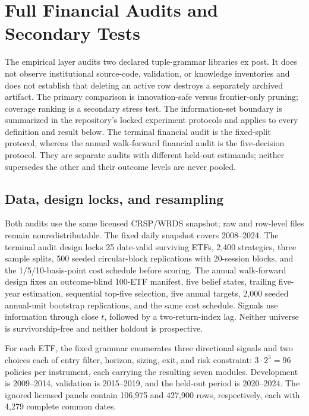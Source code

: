 \section{Full Financial Audits and Secondary Tests}
\label{sec:supp-financial-audit}

The empirical layer audits two declared tuple-grammar libraries ex post. It
does not observe institutional source-code, validation, or knowledge
inventories and does not establish that deleting an active row destroys a
separately archived artifact. The primary comparison is innovation-safe versus
frontier-only pruning; coverage ranking is a secondary stress test. The
information-set boundary is summarized in
the repository's locked experiment protocols and applies to every definition
and result below.
The terminal financial audit is the fixed-split protocol, whereas the annual
walk-forward financial audit is the five-decision protocol.  They are separate
audits with different held-out estimands; neither supersedes the other and
their outcome levels are never pooled.

\subsection{Data, design locks, and resampling}

Both audits use the same licensed CRSP/WRDS snapshot; raw and row-level files
remain nonredistributable.  The fixed daily snapshot covers 2008--2024.  The
terminal audit design locks 25 date-valid surviving ETFs, 2,400 strategies, three
sample splits, 500 seeded circular-block replications with 20-session blocks,
and the 1/5/10-basis-point cost schedule before scoring.  The annual
walk-forward design fixes an outcome-blind 100-ETF manifest, five belief
states, trailing five-year estimation, sequential top-five selection, five
annual targets, 2,000 seeded annual-unit bootstrap replications, and the same
cost schedule.  Signals use information through close \(t\), followed by a
two-return-index lag.  Neither universe is survivorship-free and neither
holdout is prospective.

For each ETF, the fixed grammar enumerates three directional signals and two
choices each of entry filter, horizon, sizing, exit, and risk constraint:
\(3\cdot2^5=96\) policies per instrument, each carrying the resulting seven
modules.  Development is 2009--2014, validation is 2015--2019, and the
held-out period is 2020--2024.  The ignored licensed panels contain 106,975
and 427,900 rows, respectively, each with 4,279 complete common dates.

